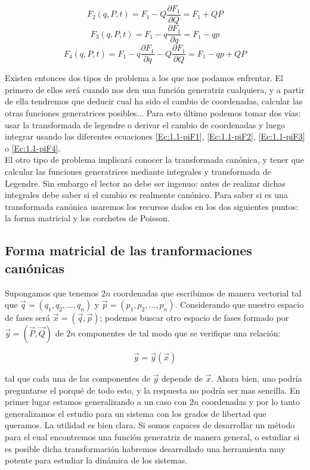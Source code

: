 \documentclass[12pt,a4paper]{article}
\numberwithin{equation}{section}
\numberwithin{figure}{section}
\newcommand{\parciales}[2]{\frac{\partial #1}{\partial #2}}
\begin{document}
\begin{equation}
F_2(q,P,t) = F_1 - Q \parciales{F_1}{Q} = F_1 + QP
\end{equation}
\begin{equation}
F_3(q,P,t) = F_1 - q \parciales{F_1}{q} = F_1 - q p
\end{equation}
\begin{equation}
F_4(q,P,t) = F_1 - q \parciales{F_1}{q} - Q \parciales{F_1}{Q} = F_1 - qp + QP 
\end{equation}

Existen entonces dos tipos de problema a los que nos podamos enfrentar. El primero de ellos será cuando nos den una función generatriz cualquiera, y a partir de ella tendremos que deducir cual ha sido el cambio de coordenadas, calcular las otras funciones generatrices posibles... Para esto último podemos tomar dos vías: usar la transformada de legendre o derivar el cambio de coordenadas y luego integrar usando las diferentes ecuaciones \ref{Ec:1.1-piF1}, \ref{Ec:1.1-piF2}, \ref{Ec:1.1-piF3} o \ref{Ec:1.1-piF4}. \\

El otro tipo de problema implicará conocer la transformada canónica, y tener que calcular las funciones generatrices mediante integrales y transformada de Legendre. Sin embargo el lector no debe ser ingenuo: antes de realizar dichas integrales debe saber si el cambio es realmente canónico. Para saber si es una transformada canónica usaremos los recursos dados en los dos siguientes puntos: la forma matricial y los corchetes de Poisson. 


\subsection{Forma matricial de las tranformaciones canónicas}

Supongamos que tenemos $2n$ coordenadas que escribimos de manera vectorial tal que $\vec{q}=(q_1,q_2,\ldots,q_n)$ y $\vec{p} = (p_1,p_2,\ldots,p_n)$. Considerando que nuestro espacio de fases será $\vec{x} = (\vec{q}, \vec{p})$; podemos buscar otro espacio de fases formado por $\vec{y} = (\vec{P},\vec{Q})$ de $2n$ componentes de tal modo que se verifique una relación:

\begin{equation}
\vec{y} = \vec{y} (\vec{x}) 
\end{equation}

tal que cada una de las componentes de $\vec{y}$ depende de $\vec{x}$. Ahora bien, uno podría preguntarse el porqué de todo esto, y la respuesta no podría ser mas sencilla. En primer lugar estamos generalizando a un caso con $2n$ coordenadas y por lo tanto generalizamos el estudio para un sistema con los grados de libertad que queramos. La utilidad es bien clara. Si somos capaces de desarrollar un método para el cual encontremos una función generatriz de manera general, o estudiar si es posible dicha transformación habremos desarrollado una herramienta muy potente para estudiar la dinámica de los sistemas. \\
\end{document}
